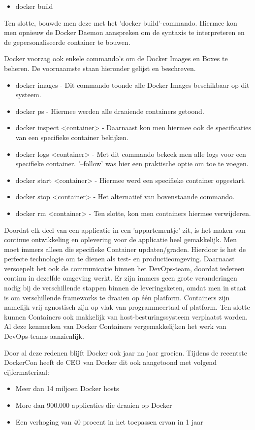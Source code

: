 \begin{itemize}[noitemsep]
	\item docker build
\end{itemize}
Ten slotte, bouwde men deze met het 'docker build'-commando. Hiermee kon men opnieuw de Docker Daemon aanspreken om de syntaxis te interpreteren en de gepersonaliseerde container te bouwen.

Docker voorzag ook enkele commando's om de Docker Images en Boxes te beheren. De voornaamste staan hieronder gelijst en beschreven.
\begin{itemize}[noitemsep]
	\item docker images - Dit commando toonde alle Docker Images beschikbaar op dit systeem.
	\item docker ps - Hiermee werden alle draaiende containers getoond.
	\item docker inspect <container> - Daarnaast kon men hiermee ook de specificaties van een specifieke container bekijken.
	\item docker logs <container> - Met dit commando bekeek men alle logs voor een specifieke container. '--follow' was hier een praktische optie om toe te voegen.
	\item docker start <container> - Hiermee werd een specifieke container opgestart.
	\item docker stop <container> - Het alternatief van bovenstaande commando.
	\item docker rm <container> - Ten slotte, kon men containers hiermee verwijderen.
\end{itemize}

Doordat elk deel van een applicatie in een 'appartementje' zit, is het maken van continue ontwikkeling en oplevering voor de applicatie heel gemakkelijk. Men moet immers alleen die specifieke Container updaten/graden. Hierdoor is het de perfecte technologie om te dienen als test- en productieomgeving. Daarnaast versoepelt het ook de communicatie binnen het DevOps-team, doordat iedereen continu in dezelfde omgeving werkt. Er zijn immers geen grote veranderingen nodig bij de verschillende stappen binnen de leveringsketen, omdat men in staat is om verschillende frameworks te draaien op één platform. Containers zijn namelijk vrij agnostisch zijn op vlak van programmeertaal of platform. Ten slotte kunnen Containers ook makkelijk van host-besturingssysteem verplaatst worden. Al deze kenmerken van Docker Containers vergemakkelijken het werk van DevOps-teams aanzienlijk.

Door al deze redenen blijft Docker ook jaar na jaar groeien. Tijdens de recentste DockerCon heeft de CEO van Docker dit ook aangetoond met volgend cijfermateriaal:
\begin{itemize}[noitemsep]
	\item Meer dan 14 miljoen Docker hosts
	\item More dan 900.000 applicaties die draaien op Docker
	\item Een verhoging van 40 procent in het toepassen ervan in 1 jaar
\end{itemize}

